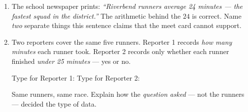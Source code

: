 \documentclass[10pt]{article}
\begin{document}
\boxguard
\begin{extensionbox}
\small
\begin{enumerate}[leftmargin=1.6em, itemsep=5pt, topsep=2pt]

  \item The school newspaper prints: \textit{``Riverbend runners average 24 minutes ---
        the fastest squad in the district.''} The arithmetic behind the $24$ is correct.
        Name \emph{two} separate things this sentence claims that the meet card cannot
        support.

  \item Two reporters cover the same five runners. Reporter 1 records \emph{how many
        minutes} each runner took. Reporter 2 records only whether each runner finished
        \emph{under 25 minutes} --- yes or no.

        Type for Reporter 1:  \hfill
        Type for Reporter 2: 

        Same runners, same race. Explain how the \emph{question asked} --- not the
        runners --- decided the type of data.

\end{enumerate}
\end{extensionbox}
\end{document}
